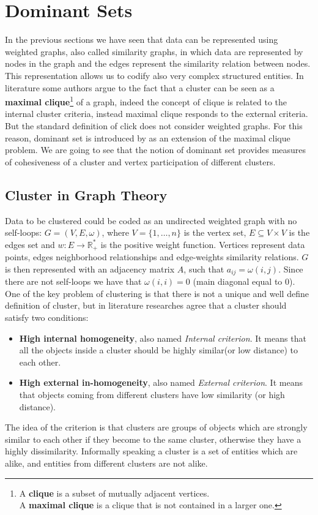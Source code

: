 \section{Dominant Sets}
In the previous sections we have seen that data can be represented using weighted graphs, also called similarity graphs, in which data are represented by nodes in the graph and the edges represent the similarity relation between nodes. This representation allows us to codify also very complex structured entities.
In literature some authors argue to the fact that a cluster can be seen as a \textbf{maximal clique}\footnote{A \textbf{clique} is a subset of mutually adjacent vertices.\\ A \textbf{maximal clique} is a clique that is not contained in a larger one.} of a graph, indeed the concept of clique is related to the internal cluster criteria, instead maximal clique responds to the external criteria. But the standard definition of click does not consider weighted graphs. For this reason, dominant set is introduced by \citeauthor{dominantset} as an extension of the maximal clique problem. We are going to see that the notion of dominant set provides measures of cohesiveness of a cluster and vertex participation of different clusters.

\subsection{Cluster in Graph Theory}
Data to be clustered could be coded as an undirected weighted graph with no self-loops: $G=(V, E, \omega)$, where $V=\{1,\dots,n\}$ is the vertex set, $E\subseteq V\times V$ is the edges set and $w: E\rightarrow \mathbb{R}^*_+$ is the positive weight function. Vertices represent data points, edges neighborhood relationships and edge-weights similarity relations. $G$ is then represented with an adjacency matrix $A$, such that $a_{ij} = \omega(i,j)$. Since there are not self-loops we have that $\omega(i,i) = 0$ (main diagonal equal to $0$).\\
One of the key problem of clustering is that there is not a unique and well define definition of cluster, but in literature researches agree that a cluster should satisfy two conditions:
\begin{itemize}
	\item \textbf{High internal homogeneity}, also named \textit{Internal criterion}. It means that all the objects inside a cluster should be highly similar(or low distance) to each other.
	\item \textbf{High external in-homogeneity}, also named \textit{External criterion}. It means that objects coming from different clusters have low similarity (or high distance).
\end{itemize}
The idea of the criterion is that clusters are groups of objects which are strongly similar to each other if they become to the same cluster, otherwise they have a highly dissimilarity. 
Informally speaking a cluster is a set of entities which are alike, and entities from different clusters are not alike.

